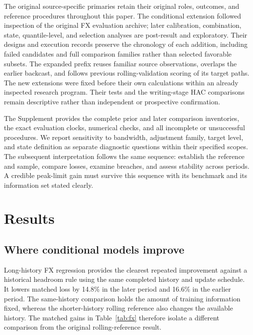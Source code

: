 \documentclass[11pt,a4paper]{article}
\begin{document}
The original source-specific primaries retain their original roles, outcomes, and reference procedures throughout this paper. The conditional extension followed inspection of the original FX evaluation archive; later calibration, combination, state, quantile-level, and selection analyses are post-result and exploratory. Their designs and execution records preserve the chronology of each addition, including failed candidates and full comparison families rather than selected favorable subsets. The expanded prefix reuses familiar source observations, overlaps the earlier backcast, and follows previous rolling-validation scoring of its target paths. The new extensions were fixed before their own calculations within an already inspected research program. Their tests and the writing-stage HAC comparisons remain descriptive rather than independent or prospective confirmation.


The Supplement provides the complete prior and later comparison inventories, the exact evaluation clocks, numerical checks, and all incomplete or unsuccessful procedures. We report sensitivity to bandwidth, adjustment family, target level, and state definition as separate diagnostic questions within their specified scopes. The subsequent interpretation follows the same sequence: establish the reference and sample, compare losses, examine breaches, and assess stability across periods. A credible peak-limit gain must survive this sequence with its benchmark and its information set stated clearly.


\FloatBarrier

\section{Results}\label{sec:results}

\subsection{Where conditional models improve}

Long-history FX regression provides the clearest repeated improvement against a historical headroom rule using the same completed history and update schedule. It lowers matched loss by 14.8\% in the later period and 16.6\% in the earlier period. The same-history comparison holds the amount of training information fixed, whereas the shorter-history rolling reference also changes the available history. The matched gains in Table~\ref{tab:fx} therefore isolate a different comparison from the original rolling-reference result.
\end{document}
